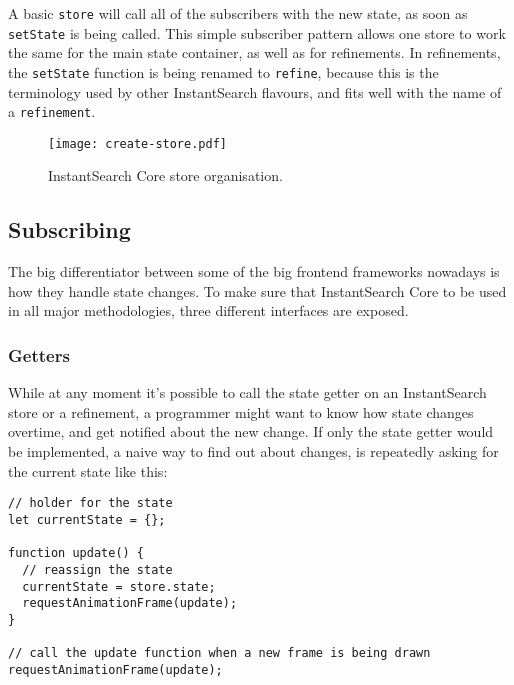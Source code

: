A basic {\tt store} will call all of the subscribers with the new state, as soon as {\tt setState} is being called. This simple subscriber pattern allows one store to work the same for the main state container, as well as for refinements. In refinements, the {\tt setState} function is being renamed to {\tt refine}, because this is the terminology used by other InstantSearch flavours, and fits well with the name of a {\tt refinement}.

\begin{figure}[H]
  \centering
  \texttt{[image: create-store.pdf]}
  \caption{InstantSearch Core store organisation.}
  \label{figure:createstore_inheritance}
\end{figure}

\subsection{Subscribing}
\label{ssec:Subscribing}

The big differentiator between some of the big frontend frameworks nowadays is how they handle state changes. To make sure that InstantSearch Core to be used in all major methodologies, three different interfaces are exposed.

\subsubsection{Getters}
\label{ssub:getters}

While at any moment it's possible to call the state getter on an InstantSearch store or a refinement, a programmer might want to know how state changes overtime, and get notified about the new change. If only the state getter would be implemented, a naive way to find out about changes, is repeatedly asking for the current state like this:

\begin{minipage}{\linewidth}
\begin{lstlisting}[caption={Naive way to find out about changed state},label={lst:is-core-naive-subscribe}]
// holder for the state
let currentState = {};

function update() {
  // reassign the state
  currentState = store.state;
  requestAnimationFrame(update);
}

// call the update function when a new frame is being drawn
requestAnimationFrame(update);
\end{lstlisting}
\end{minipage}

